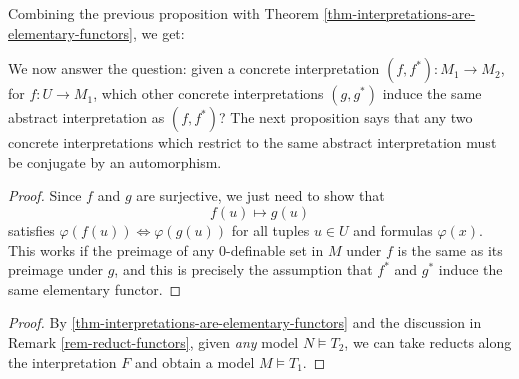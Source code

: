 Combining the previous proposition with Theorem \ref{thm-interpretations-are-elementary-functors}, we get:



We now answer the question: given a concrete interpretation \((f, f^{*}) : M_1 \to M_2\), for \(f : U \to M_1\), which other concrete interpretations \((g,g^*)\) induce the same abstract interpretation as \((f,f^*)\)? The next proposition says that any two concrete interpretations which restrict to the same abstract interpretation must be conjugate by an automorphism.


\begin{proof}Since \(f\) and \(g\) are surjective, we just need to show that \[f(u) \mapsto g(u)\] satisfies \(\varphi(f(u)) \iff \varphi(g(u))\) for all tuples \(u \in U\) and formulas \(\varphi(x).\) This works if the preimage of any \(0\)-definable set in \(M\) under \(f\) is the same as its preimage under \(g\), and this is precisely the assumption that \(f^*\) and \(g^*\) induce the same elementary functor.\end{proof}


\begin{proof}
By \ref{thm-interpretations-are-elementary-functors} and the discussion in Remark \ref{rem-reduct-functors}, given \emph{any} model $N \models T_2$, we can take reducts along the interpretation $F$ and obtain a model $M \models T_1$.
  \end{proof}

